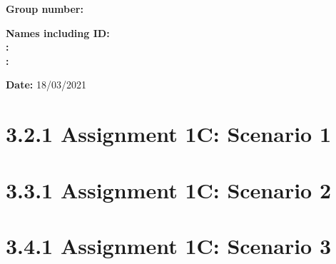 \documentclass[12pt]{article}
\renewcommand{\_}{\kern-1.5pt\textunderscore\kern-1.5pt}
\begin{document}
\vspace{\baselineskip}

\vspace{\baselineskip}

\vspace{\baselineskip}

\vspace{\baselineskip}

\vspace{\baselineskip}
\textbf{Group number: } %
\par

\textbf{Names including ID:\\
: } %
\\
\textbf{: } %
\par

\textbf{Date: }18/03/2021\par

\newpage
\section*{3.2.1  Assignment 1C: Scenario 1}
\subsubsection{}
\subsubsection{}
\subsubsection{}
\subsubsection{}


\section*{3.3.1  Assignment 1C: Scenario 2}
\setcounter{subsubsection}
\subsubsection{}
\subsubsection{}
\subsubsection{}


\section*{3.4.1  Assignment 1C: Scenario 3}

\printbibliography
\end{document}
